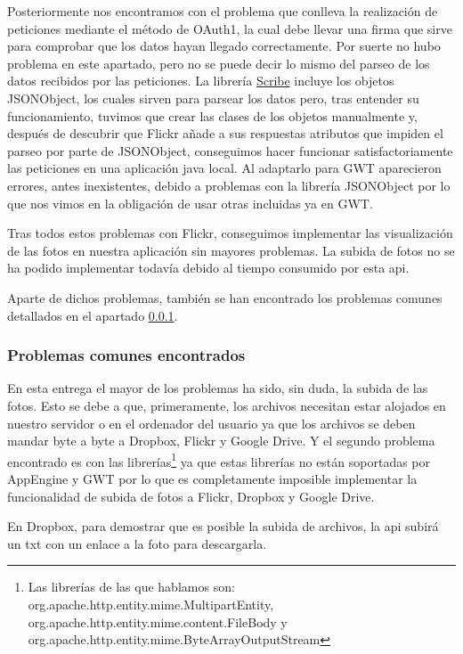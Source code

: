 \documentclass{scrartcl}
\begin{document}
Posteriormente nos encontramos con el problema que conlleva la realización de peticiones mediante el método de OAuth1, la cual debe llevar una firma que sirve para comprobar que los datos hayan llegado correctamente. Por suerte no hubo problema en este apartado, pero no se puede decir lo mismo del parseo de los datos recibidos por las peticiones. La librería \href{https://github.com/fernandezpablo85/scribe-java}{Scribe} incluye los objetos JSONObject, los cuales sirven para parsear los datos pero, tras entender su funcionamiento, tuvimos que crear las clases de los objetos manualmente y, después de descubrir que Flickr añade a sus respuestas atributos que impiden el parseo por parte de JSONObject, conseguimos hacer funcionar satisfactoriamente las peticiones en una aplicación java local. Al adaptarlo para GWT aparecieron errores, antes inexistentes, debido a problemas con la librería JSONObject por lo que nos vimos en la obligación de usar otras incluidas ya en GWT.

Tras todos estos problemas con Flickr, conseguimos implementar las visualización de las fotos en nuestra aplicación sin mayores problemas. La subida de fotos no se ha podido implementar todavía debido al tiempo consumido por esta api.

Aparte de dichos problemas, también se han encontrado los problemas comunes detallados en el apartado \ref{cap:problemasComunesEncontrados}.

\subsubsection{Problemas comunes encontrados}\label{cap:problemasComunesEncontrados}
En esta entrega el mayor de los problemas ha sido, sin duda, la subida de las fotos. Esto se debe a que, primeramente, los archivos necesitan estar alojados en nuestro servidor o en el ordenador del usuario ya que  los archivos se deben mandar byte a byte a Dropbox, Flickr y Google Drive. Y el segundo problema encontrado es con las librerías\footnote{Las librerías de las que hablamos son: org.apache.http.entity.mime.MultipartEntity, org.apache.http.entity.mime.content.FileBody y org.apache.http.entity.mime.ByteArrayOutputStream} ya que estas librerías no están soportadas por AppEngine y GWT por lo que es completamente imposible implementar la funcionalidad de subida de fotos a Flickr, Dropbox y Google Drive.

En Dropbox, para demostrar que es posible la subida de archivos, la api subirá  un txt con un enlace a la foto para descargarla.
\end{document}

